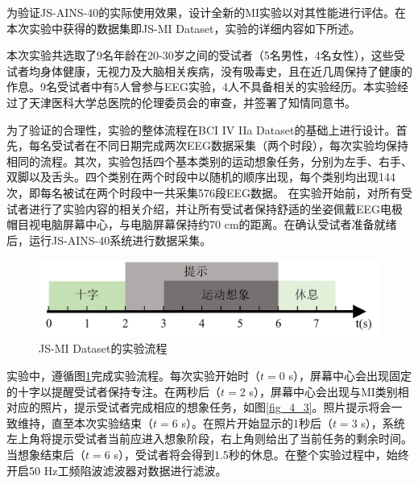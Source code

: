 为验证JS-AINS-40的实际使用效果，设计全新的MI实验以对其性能进行评估。在本次实验中获得的数据集即JS-MI Dataset，实验的详细内容如下所述。

本次实验共选取了9名年龄在20-30岁之间的受试者（5名男性，4名女性），这些受试者均身体健康，无视力及大脑相关疾病，没有吸毒史，且在近几周保持了健康的作息。9名受试者中有5人曾参与EEG实验，4人不具备相关的实验经历。本实验经过了天津医科大学总医院的伦理委员会的审查，并签署了知情同意书。

为了验证的合理性，实验的整体流程在BCI IV IIa Dataset的基础上进行设计。首先，每名受试者在不同日期完成两次EEG数据采集（两个时段），每次实验均保持相同的流程。其次，实验包括四个基本类别的运动想象任务，分别为左手、右手、双脚以及舌头。四个类别在两个时段中以随机的顺序出现，每个类别均出现144次，即每名被试在两个时段中一共采集576段EEG数据。
在实验开始前，对所有受试者进行了实验内容的相关介绍，并让所有受试者保持舒适的坐姿佩戴EEG电极帽目视电脑屏幕中心，与电脑屏幕保持约70 cm的距离。在确认受试者准备就绪后，运行JS-AINS-40系统进行数据采集。

\begin{figure}[h]
	\centering
	\includegraphics[width=0.5\textheight]{figures/运动想象实验流程.jpg}
	\caption{JS-MI Dataset的实验流程} 
	\label{fig_4_2}
\end{figure}

实验中，遵循图\ref{fig_4_2}完成实验流程。每次实验开始时（$t=0$ s），屏幕中心会出现固定的十字以提醒受试者保持专注。在两秒后（$t=2$ s），屏幕中心会出现与MI类别相对应的照片，提示受试者完成相应的想象任务，如图\ref{fig_4_3}。照片提示将会一致维持，直至本次实验结束（$t=6$ s）。在照片开始显示的1秒后（$t=3$ s），系统左上角将提示受试者当前应进入想象阶段，右上角则给出了当前任务的剩余时间。当想象结束后（$t=6$ s），受试者将会得到1.5秒的休息。在整个实验过程中，始终开启50 Hz工频陷波滤波器对数据进行滤波。

\vspace{7mm}

